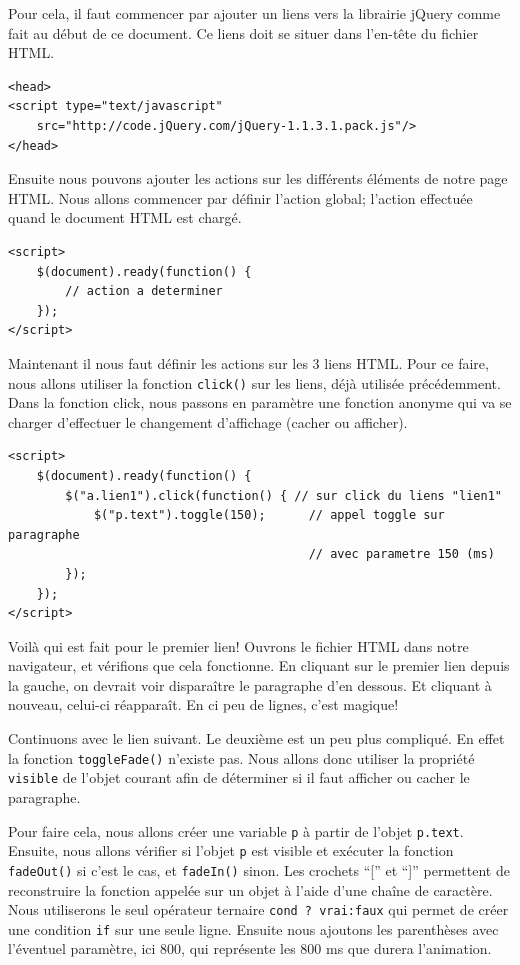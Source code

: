 \documentclass[10pt,a4paper,titlepage]{article}
\begin{document}
Pour cela, il faut commencer par ajouter un liens vers la librairie jQuery comme fait au début de ce document. Ce liens doit se situer dans l'en-tête du fichier HTML.

\begin{lstlisting}
<head>
<script type="text/javascript" 
	src="http://code.jQuery.com/jQuery-1.1.3.1.pack.js"/>
</head>
\end{lstlisting}

Ensuite nous pouvons ajouter les actions sur les différents éléments de notre page HTML. Nous allons commencer par définir l'action global; l'action effectuée quand le document HTML est chargé. 

\begin{lstlisting}
<script>
	$(document).ready(function() {		
		// action a determiner
	});
</script>
\end{lstlisting}

Maintenant il nous faut définir les actions sur les 3 liens HTML. Pour ce faire, nous allons utiliser la fonction \texttt{click()} sur les liens, déjà utilisée précédemment. Dans la fonction click, nous passons en paramètre une fonction anonyme qui va se charger d'effectuer le changement d'affichage (cacher ou afficher).

\begin{lstlisting}
<script>
	$(document).ready(function() {    
		$("a.lien1").click(function() { // sur click du liens "lien1"
			$("p.text").toggle(150);      // appel toggle sur paragraphe
			                              // avec parametre 150 (ms)        
		});
	});
</script>
\end{lstlisting}

Voilà qui est fait pour le premier lien! Ouvrons le fichier HTML dans notre navigateur, et vérifions que cela fonctionne. En cliquant sur le premier lien depuis la gauche, on devrait voir disparaître le paragraphe d'en dessous. Et cliquant à nouveau, celui-ci réapparaît. En ci peu de lignes, c'est magique!

Continuons avec le lien suivant. Le deuxième est un peu plus compliqué. En effet la fonction \texttt{toggleFade()} n'existe pas. Nous allons donc utiliser la propriété \texttt{visible} de l'objet courant afin de déterminer si il faut afficher ou cacher le paragraphe. 

Pour faire cela, nous allons créer une variable \texttt{p} à partir de l'objet \texttt{p.text}. Ensuite, nous allons vérifier si l'objet \texttt{p} est visible et exécuter la fonction \texttt{fadeOut()} si c'est le cas, et \texttt{fadeIn()} sinon. Les crochets “[” et “]” permettent de reconstruire la fonction appelée sur un objet à l'aide d'une chaîne de caractère. Nous utiliserons le seul opérateur ternaire \texttt{cond ? vrai:faux} qui permet de créer une condition \texttt{if} sur une seule ligne. Ensuite nous ajoutons les parenthèses avec l'éventuel paramètre, ici 800, qui représente les 800 ms que durera l'animation.
\end{document}
